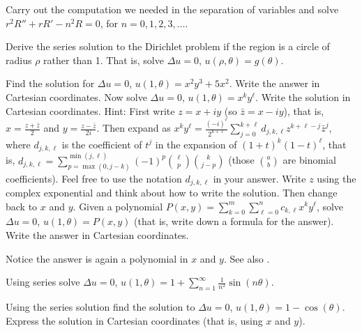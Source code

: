 \begin{exercise}
Carry out the computation we needed in the separation of variables and solve
$r^2 R'' + r R' - n^2 R = 0$, for $n=0,1,2,3,\ldots$.
\end{exercise}

\begin{exercise}[challenging]
Derive the series solution to the Dirichlet problem if the region is a
circle of radius $\rho$ rather
than 1.
That is, solve $\Delta u = 0$, $u(\rho,\theta) = g(\theta)$.
\end{exercise}

\begin{exercise}[challenging]
\leavevmode
\begin{tasks}
\task
Find the solution for
$\Delta u = 0$, $u(1,\theta) = x^2y^3 + 5 x^2$.  Write the answer in Cartesian coordinates.
\task
Now solve
$\Delta u = 0$, $u(1,\theta) = x^k y^\ell$.
Write the solution in Cartesian coordinates.
Hint: First write $z=x+iy$ (so $\bar{z}=x-iy$), that is,
$x = \frac{z+\bar{z}}{2}$ and 
$y = \frac{z-\bar{z}}{2i}$.
Then expand as
$x^k y^\ell =
\frac{{(-i)}^\ell}{2^{k+\ell}} \sum_{j=0}^{k+\ell} d_{j,k,\ell}
z^{k+\ell-j}\bar{z}^j$,
where
$d_{j,k,\ell}$ is the coefficient of $t^j$ in the expansion of
${(1+t)}^k{(1-t)}^\ell$,
that is,
$d_{j,k,\ell} = \sum_{p=\max(0,j-k)}^{\min(j,\ell)} {(-1)}^p \binom{\ell}{p}
\binom{k}{j-p}$
(those $\binom{a}{b}$ are binomial coefficients).
Feel free to use the notation $d_{j,k,\ell}$ in your answer.
Write $z$ using the complex exponential and think about
how to write the solution.  Then change back to $x$
and $y$.
\task
Given a polynomial $P(x,y) = \sum_{k=0}^m \sum_{\ell=0}^n c_{k,\ell}
x^k y^\ell$, solve $\Delta u = 0$, $u(1,\theta) = P(x,y)$ (that is, write down
a formula for the answer).  Write the answer
in Cartesian coordinates.
\end{tasks}
Notice the answer is again a polynomial in $x$ and $y$.
See also .
\end{exercise}

\setcounter{exercise}{100}

\begin{exercise}
Using series solve
$\Delta u = 0$, $u(1,\theta) = 1+ \sum\limits_{n=1}^\infty \frac{1}{n^2}\sin(n\theta)$.
\end{exercise}

\begin{exercise}
Using the series solution find the solution to
$\Delta u = 0$, $u(1,\theta) = 1- \cos(\theta)$.  Express the solution
in Cartesian coordinates (that is, using $x$ and $y$).
\end{exercise}

